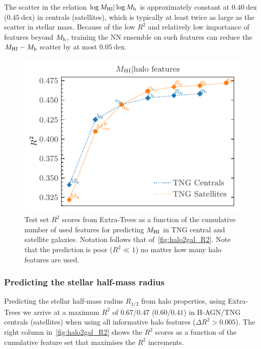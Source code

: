 \documentclass[useAMS,usenatbib]{mnras}
\begin{document}
The scatter in the relation $\log M_\mathrm{HI} | \log M_{\rm h}$ is approximately constant at $0.40~\mathrm{dex}$ ($0.45~\mathrm{dex}$) in centrals (satellites), which is typically at least twice as large as the scatter in stellar mass. Because of the low $R^2$ and relatively low importance of features beyond $M_{\rm h}$, training the NN ensemble on such features can reduce the $M_{\rm HI} - M_{\rm h}$ scatter by at most $0.05~\mathrm{dex}$.

\begin{figure}
    \centering
    \includegraphics[width=\columnwidth]{Figures/galaxy_Mhi_R2.pdf}
    \caption{Test set $R^2$ scores from Extra-Trees as a function of the cumulative number of used features for predicting $M_{\rm HI}$ in TNG central and satellite galaxies. Notation follows that of~\cref{fig:halo2gal_R2}. Note that the prediction is poor ($R^2 \ll 1$) no matter how many halo features are used.}
    \label{fig:neutral_hydrogen_R2s}
\end{figure}


\subsubsection{Predicting the stellar half-mass radius}

Predicting the stellar half-mass radius $R_{1/2}$ from halo properties, using Extra-Trees we arrive at a maximum $R^2$ of $0.67$/$0.47$ ($0.60$/$0.41$) in H-AGN/TNG centrals (satellites) when using all informative halo features ($\Delta R^2 > 0.005$). The right column in~\cref{fig:halo2gal_R2} shows the $R^2$ scores as a function of the cumulative feature set that maximises the $R^2$ increments.
\end{document}
